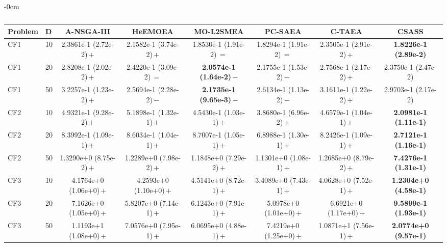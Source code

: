 \begin{table}[!htbp]
\begin{ROneBlock}
\begin{adjustwidth}{-\extralength}{0cm}
\centering
\scriptsize
\setlength{\tabcolsep}{3pt}
\renewcommand{\arraystretch}{1.12}
\caption{}\label{tab:cf-igd}
\begin{tabular*}{\linewidth}{@{\extracolsep{\fill}}llcccccc@{}}
\toprule
Problem & D & A-NSGA-III & HeEMOEA & MO-L2SMEA & PC-SAEA & C-TAEA & CSASS \\
\midrule
CF1 & 10 & 2.3861e-1 (2.72e-2)\,$+$ & 2.1582e-1 (3.74e-2)\,$+$ & 1.8530e-1 (1.91e-2)\,$=$ & 1.8294e-1 (1.91e-2)\,$=$ & 2.3505e-1 (2.91e-2)\,$+$ & \textbf{1.8226e-1 (2.89e-2)} \\
CF1 & 20 & 2.8208e-1 (2.02e-2)\,$+$ & 2.4220e-1 (3.09e-2)\,$=$ & \textbf{2.0574e-1 (1.64e-2)}\,$-$ & 2.1755e-1 (1.53e-2)\,$-$ & 2.7568e-1 (2.17e-2)\,$+$ & 2.3750e-1 (2.47e-2) \\
CF1 & 50 & 3.2257e-1 (1.23e-2)\,$+$ & 2.5694e-1 (2.28e-2)\,$-$ & \textbf{2.1735e-1 (9.65e-3)}\,$-$ & 2.6134e-1 (1.13e-2)\,$-$ & 3.1611e-1 (1.22e-2)\,$+$ & 2.9703e-1 (2.17e-2) \\
CF2 & 10 & 4.9321e-1 (9.28e-2)\,$+$ & 5.1898e-1 (1.32e-1)\,$+$ & 4.5430e-1 (1.03e-1)\,$+$ & 3.8680e-1 (6.96e-2)\,$+$ & 4.6579e-1 (1.04e-1)\,$+$ & \textbf{2.0981e-1 (1.11e-1)} \\
CF2 & 20 & 8.3992e-1 (1.09e-1)\,$+$ & 8.6034e-1 (1.04e-1)\,$+$ & 8.7007e-1 (1.05e-1)\,$+$ & 6.8988e-1 (1.30e-1)\,$+$ & 8.2426e-1 (1.09e-1)\,$+$ & \textbf{2.7121e-1 (1.16e-1)} \\
CF2 & 50 & 1.3290e+0 (8.75e-2)\,$+$ & 1.2289e+0 (7.98e-2)\,$+$ & 1.1848e+0 (7.29e-2)\,$+$ & 1.1301e+0 (1.08e-1)\,$+$ & 1.2685e+0 (8.79e-2)\,$+$ & \textbf{7.4276e-1 (1.31e-1)} \\
CF3 & 10 & 4.1764e+0 (1.06e+0)\,$+$ & 4.2593e+0 (1.10e+0)\,$+$ & 4.5141e+0 (8.72e-1)\,$+$ & 3.4089e+0 (7.43e-1)\,$+$ & 4.0628e+0 (7.52e-1)\,$+$ & \textbf{1.2304e+0 (4.58e-1)} \\
CF3 & 20 & 7.1626e+0 (1.05e+0)\,$+$ & 5.8207e+0 (7.14e-1)\,$+$ & 6.1243e+0 (7.91e-1)\,$+$ & 5.0978e+0 (1.01e+0)\,$+$ & 6.6921e+0 (1.17e+0)\,$+$ & \textbf{9.5899e-1 (1.93e-1)} \\
CF3 & 50 & 1.1193e+1 (1.08e+0)\,$+$ & 7.0576e+0 (7.95e-1)\,$+$ & 6.0695e+0 (4.88e-1)\,$+$ & 7.4219e+0 (1.25e+0)\,$+$ & 1.0871e+1 (7.56e-1)\,$+$ & \textbf{2.0774e+0 (9.57e-1)} \\

\end{tabular*}
\end{adjustwidth}
\end{ROneBlock}
\end{table}
